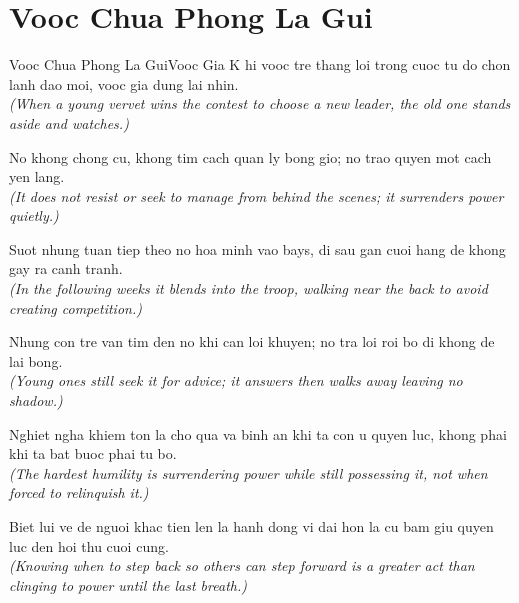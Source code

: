 \section{Vooc Chua Phong La Gui}
\begin{truyen}{Vooc Chua Phong La Gui}{Vooc Gia}
K hi vooc tre thang loi trong cuoc tu do chon lanh dao moi, vooc gia dung lai nhin.\\
\textit{(When a young vervet wins the contest to choose a new leader, the old one stands aside and watches.)}

No khong chong cu, khong tim cach quan ly bong gio; no trao quyen mot cach yen lang.\\
\textit{(It does not resist or seek to manage from behind the scenes; it surrenders power quietly.)}

Suot nhung tuan tiep theo no hoa minh vao bays, di sau gan cuoi hang de khong gay ra canh tranh.\\
\textit{(In the following weeks it blends into the troop, walking near the back to avoid creating competition.)}

Nhung con tre van tim den no khi can loi khuyen; no tra loi roi bo di khong de lai bong.\\
\textit{(Young ones still seek it for advice; it answers then walks away leaving no shadow.)}

Nghiet ngha khiem ton la cho qua va binh an khi ta con u quyen luc, khong phai khi ta bat buoc phai tu bo.\\
\textit{(The hardest humility is surrendering power while still possessing it, not when forced to relinquish it.)}

\end{truyen}
\begin{baihoc}
  Biet lui ve de nguoi khac tien len la hanh dong vi dai hon la cu bam giu quyen luc den hoi thu cuoi cung.\\
  \textit{(Knowing when to step back so others can step forward is a greater act than clinging to power until the last breath.)}
\end{baihoc}

